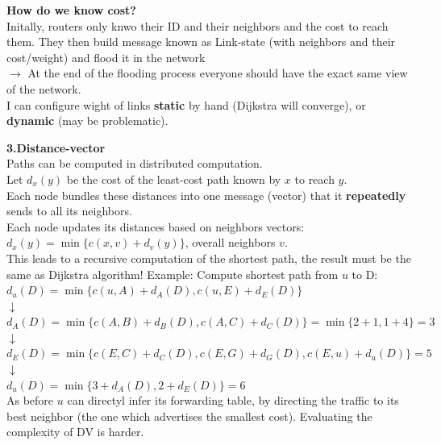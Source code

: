 \documentclass[a4paper, fontsize=8pt, landscape, DIV=1]{scrartcl}
\begin{document}
\begin{multicols*}{4}
		    \textbf{How do we know cost?}\\
		   	Initally, routers only knwo their ID and their neighbors and the cost to reach them. They then build message known as Link-state (with neighbors and their cost/weight) and flood it in the network\\
		    $\rightarrow$ At the end of the flooding process everyone should have the exact same view of the network. \\
		    I can configure wight of links \textbf{static} by hand (Dijkstra will converge), or \textbf{dynamic} (may be problematic).\par 
		    
		    \textbf{3.Distance-vector}\\
		    Paths can be computed in distributed computation.\\
		    Let $d_x(y)$ be the cost of the least-cost path known by $x$ to reach $y$. \\
		    Each node bundles these distances into one message (vector) that it \textbf{repeatedly} sends to all its neighbors. \\
		    Each node updates its distances based on neighbors vectors:\\
		    $d_x(y)=\min\{c(x,v)+d_v(y)\}$, overall neighbors $v$.\\
		    This leads to a recursive computation of the shortest path, the result must be the same as Dijkstra algorithm! 
		    Example: Compute shortest path from $u$ to D:\\
		    $d_u(D)=\min\{c(u,A)+d_A(D), c(u,E)+d_E(D)\}$\\
		    $\downarrow$\\
		    $d_A(D)=\min\{c(A,B)+d_B(D), c(A,C)+d_C(D)\}=\min\{2+1,1+4\}=3$\\
		    $\downarrow$\\
		    $d_E(D)=\min\{c(E,C)+d_C(D), c(E,G)+d_G(D),c(E,u)+d_u(D)\}=5$\\
		    $\downarrow$\\
		    $d_u(D)=\min\{3+d_A(D), 2+d_E(D)\}=6$\\
		    As before $u$ can directyl infer its forwarding table, by directing the traffic to its best neighbor (the one which advertises the smallest cost). Evaluating the complexity of DV is harder. 
		    

\end{multicols*}
\end{document}
